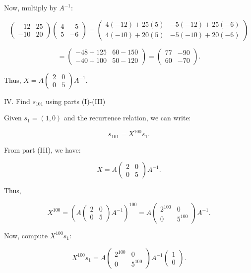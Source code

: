\documentclass{article}
\begin{document}
	Now, multiply by \( A^{-1} \):
	
	\[ \begin{pmatrix} -12 & 25 \\ -10 & 20 \end{pmatrix} \begin{pmatrix} 4 & -5 \\ 5 & -6 \end{pmatrix} = \begin{pmatrix} 4(-12) + 25(5) & -5(-12) + 25(-6) \\ 4(-10) + 20(5) & -5(-10) + 20(-6) \end{pmatrix} \]
	
	\[ = \begin{pmatrix} -48 + 125 & 60 - 150 \\ -40 + 100 & 50 - 120 \end{pmatrix} = \begin{pmatrix} 77 & -90 \\ 60 & -70 \end{pmatrix}. \]
	
	Thus, \( X = A \begin{pmatrix} 2 & 0 \\ 0 & 5 \end{pmatrix} A^{-1} \).
	
	IV. Find \( s_{101} \) using parts (I)-(III)
	
	Given \( s_1 = (1, 0) \) and the recurrence relation, we can write:
	
	\[ s_{101} = X^{100} s_1. \]
	
	From part (III), we have:
	
	\[ X = A \begin{pmatrix} 2 & 0 \\ 0 & 5 \end{pmatrix} A^{-1}. \]
	
	Thus,
	
	\[ X^{100} = \left( A \begin{pmatrix} 2 & 0 \\ 0 & 5 \end{pmatrix} A^{-1} \right)^{100} = A \begin{pmatrix} 2^{100} & 0 \\ 0 & 5^{100} \end{pmatrix} A^{-1}. \]
	
	Now, compute \( X^{100} s_1 \):
	
	\[ X^{100} s_1 = A \begin{pmatrix} 2^{100} & 0 \\ 0 & 5^{100} \end{pmatrix} A^{-1} \begin{pmatrix} 1 \\ 0 \end{pmatrix}. \]
	
\end{document}
